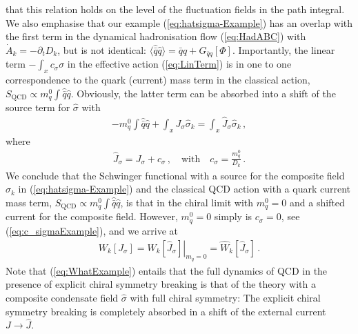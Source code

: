 \documentclass[%
reprint,
superscriptaddress,
showpacs,preprintnumbers,
 amsmath,amssymb,
 aps,
prd,
]{revtex4-1}
\def\eq#1{(\ref{#1})}
\begin{document}
that this relation holds on the level of the fluctuation fields in the
path integral. We also emphasise that our example
\eq{eq:hatsigma-Example} has an overlap with the first term in the
dynamical hadronisation flow \eq{eq:HadABC} with
$\dot{A}_k=-\partial_t D_k$, but is not identical:
$\langle \hat{\bar q} \hat q\rangle = \bar q q + G_{\bar q
  q}[\Phi]$. Importantly, the linear term $-\int_x c_\sigma \sigma$ in
the effective action \eq{eq:LinTerm} is in one to one correspondence
to the quark (current) mass term in the classical action,
$S_\textrm{QCD} \propto m^0_q \int \hat{\bar q} \hat{q}$. Obviously,
the latter term can be absorbed into a shift of the source term for
$\hat\sigma$ with
%
\begin{align}\label{eq:absorbtion}
  - m^0_q \int \hat{\bar q} \hat{q}  + \int_x J_\sigma \hat\sigma_k =
  \int_x \hat J_\sigma \hat\sigma_k\,, 
\end{align}
%
where 
%
\begin{align}\label{eq:c_sigmaExample}
  \hat J_\sigma = J_\sigma + c_\sigma\,, \quad \textrm{with}
  \quad c_\sigma
  =\frac{m^0_q}{D_k}\,.
\end{align}
%
We conclude that the Schwinger functional with a source for the
composite field $\hat \sigma_k$ in \eq{eq:hatsigma-Example} and the
classical QCD action with a quark current mass term,
$S_\textrm{QCD} \propto m^0_q \int \hat{\bar q}\hat{ q}$, is that in
the chiral limit with $m^0_q=0$ and a shifted current for the
composite field. However, $m^0_q=0$ simply is $c_\sigma=0$, see
\eq{eq:c_sigmaExample}, and we arrive at
%
\begin{align}\label{eq:WhatExample}
  W_k[J_\sigma] = \left. W_k[\hat J_\sigma]\right|_{m_q=0}=
  \widehat
  W_k[\hat J_\sigma]\,.
\end{align}
%
Note that \eq{eq:WhatExample} entails that the full dynamics of QCD in
the presence of explicit chiral symmetry breaking is that of the
theory with a composite condensate field $\hat\sigma$ with full chiral
symmetry: The explicit chiral symmetry breaking is completely
  absorbed in a shift of the external current $J\to \hat J$. 
\end{document}
